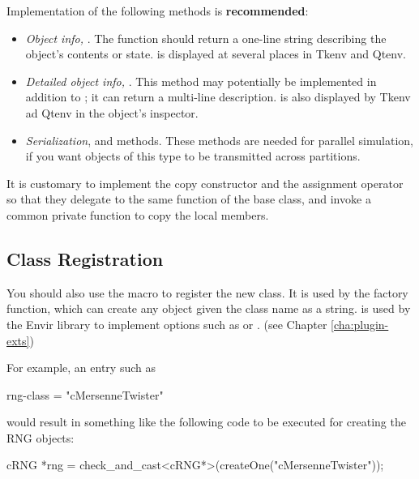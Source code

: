 Implementation of the following methods is \textbf{recommended}:

\begin{itemize}
  \item{\textit{Object info,} . The  function
        should return a one-line string describing the object's contents or state.
         is displayed at several places in Tkenv and Qtenv.}
  \item{\textit{Detailed object info,} .
        This method may potentially be implemented in addition to ;
        it can return a multi-line description.  is also
        displayed by Tkenv ad Qtenv in the object's inspector.}
  \item{\textit{Serialization},  and  methods.
        These methods are needed for parallel simulation, if you want
        objects of this type to be transmitted across partitions.}
\end{itemize}

It is customary to implement the copy constructor and the assignment operator
so that they delegate to the same function of the base class, and invoke a common
private  function to copy the local members.

\subsection{Class Registration}

You should also use the  macro to register the
new class. It is used by the  factory function, which can
create any object given the class name as a string. 
is used by the Envir library to implement  options
such as  or .
(see Chapter \ref{cha:plugin-exts})

For example, an  entry such as

\begin{inifile}
rng-class = "cMersenneTwister"
\end{inifile}

would result in something like the following code to be executed
for creating the RNG objects:

\begin{cpp}
cRNG *rng = check_and_cast<cRNG*>(createOne("cMersenneTwister"));
\end{cpp}

